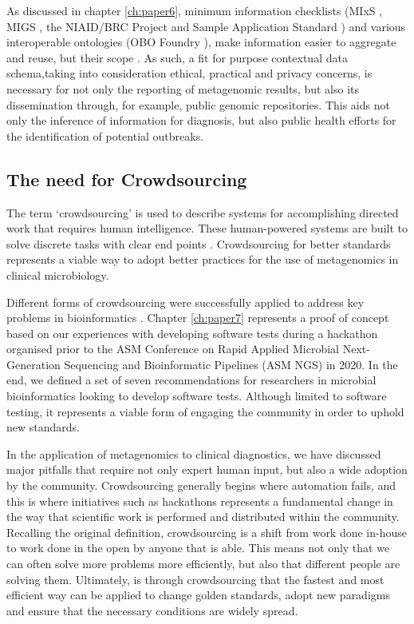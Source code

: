 As discussed in chapter \ref{ch:paper6}, minimum information checklists (MIxS \cite{yilmaz_minimum_2011}, MIGS \cite{field_minimum_2008}, the NIAID/BRC Project and Sample Application Standard \cite{dugan_standardized_2014}) and various interoperable ontologies (OBO Foundry \cite{smith_obo_2007}), make information easier to aggregate and reuse, but their scope . As such, a fit for purpose contextual data schema,taking into consideration ethical, practical and privacy concerns, is necessary for not only the reporting of metagenomic results, but also its dissemination through, for example, public genomic repositories. This aids not only the inference of information for diagnosis, but also public health efforts for the identification of potential outbreaks.  

\subsection{The need for Crowdsourcing}

The term ‘crowdsourcing’ is used to describe systems for accomplishing directed work that requires human intelligence. These human-powered systems are built to solve discrete tasks with clear end points \citep{good_crowdsourcing_2013}. Crowdsourcing for better standards represents a viable way to adopt better practices for the use of metagenomics in clinical microbiology.

Different forms of crowdsourcing were successfully applied to address key problems in bioinformatics \citep{good_crowdsourcing_2013, connor_ncbis_2019, powell_organizing_2021}. Chapter \ref{ch:paper7} represents a proof of concept based on our experiences with developing software tests during a hackathon organised prior to the ASM Conference on Rapid Applied Microbial Next-Generation Sequencing and Bioinformatic Pipelines (ASM NGS) in 2020. In the end, we defined a set of
seven recommendations for researchers in microbial bioinformatics looking to develop software tests. Although limited to software testing, it represents a viable form of engaging the community in order to uphold new standards.

In the application of metagenomics to clinical diagnostics, we have discussed major pitfalls that require not only expert human input, but also a wide adoption by the community. Crowdsourcing generally begins where automation fails, and this is where initiatives such as hackathons represents a fundamental change in the way that scientific work is performed and distributed within the community. Recalling the original definition, crowdsourcing is a shift from work done in-house to work done in the open by anyone that is able. This means not only that we can often solve more problems more efficiently, but also that different people are solving them. Ultimately, is through crowdsourcing that the fastest and most efficient way can be applied to change golden standards, adopt new paradigms and ensure that the necessary conditions are widely spread. 

